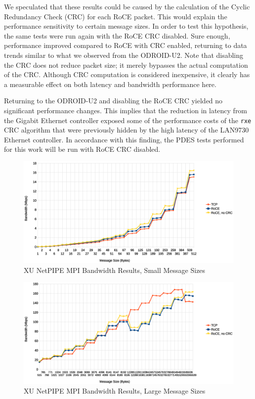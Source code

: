 \documentclass[11pt]{book}
\begin{document}
We speculated that these results could be caused by the calculation of the Cyclic
Redundancy Check (CRC) for each RoCE packet.  This would explain the performance
sensitivity to certain message sizes. In order to test this hypothesis, the same tests
were run again with the RoCE CRC disabled.  Sure enough, performance improved compared to
RoCE with CRC enabled, returning to data trends similar to what we observed from the
ODROID-U2.  Note that disabling the CRC does not reduce packet size; it merely bypasses
the actual computation of the CRC.  Although CRC computation is considered inexpensive, it
clearly has a measurable effect on both latency and bandwidth performance here.

Returning to the ODROID-U2 and disabling the RoCE CRC yielded no significant performance
changes.  This implies that the reduction in latency from the Gigabit Ethernet controller
exposed some of the performance costs of the \verb;rxe; CRC algorithm that were previously
hidden by the high latency of the LAN9730 Ethernet controller.  In accordance with this
finding, the PDES tests performed for this work will be run with RoCE CRC disabled.

\begin{figure}
\includegraphics[width=\textwidth]{xu_bw_small}
\caption{XU NetPIPE MPI Bandwidth Results, Small Message Sizes}
\label{xu-bw-small}
\end{figure}

\begin{figure}
\includegraphics[width=\textwidth]{xu_bw_large}
\caption{XU NetPIPE MPI Bandwidth Results, Large Message Sizes}
\label{xu-bw-large}
\end{figure}
\end{document}
